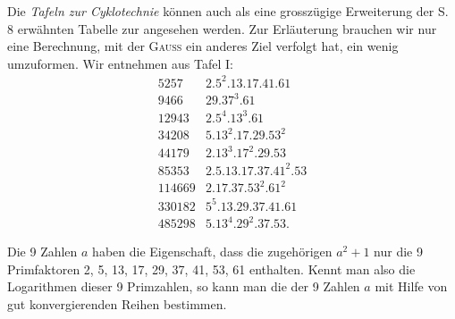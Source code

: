 Die \textit{Tafeln zur Cyklotechnie} können auch als eine grosszügige Erweiterung
der S. 8 erwähnten Tabelle zur  angesehen
werden. Zur Erläuterung brauchen wir nur eine Berechnung, mit der \textsc{Gauss}
ein anderes Ziel verfolgt hat, ein wenig umzuformen. Wir entnehmen aus
Tafel I:
\[
\begin{array}{r|l}
5257&2\mathord{.}5^2\mathord{.}13\mathord{.}17\mathord{.}41\mathord{.}61\\
9466&29\mathord{.}37^3\mathord{.}61\\
12943&2\mathord{.}5^4\mathord{.}13^3\mathord{.}61\\
34208&5\mathord{.}13^2\mathord{.}17\mathord{.}29\mathord{.}53^2\\
44179&2\mathord{.}13^3\mathord{.}17^2\mathord{.}29\mathord{.}53\\
85353&2\mathord{.}5\mathord{.}13\mathord{.}17\mathord{.}37\mathord{.}41^2\mathord{.}53\\
114669&2\mathord{.}17\mathord{.}37\mathord{.}53^2\mathord{.}61^2\\
330182&5^5\mathord{.}13\mathord{.}29\mathord{.}37\mathord{.}41\mathord{.}61\\
485298&5\mathord{.}13^4\mathord{.}29^2\mathord{.}37\mathord{.}53.
\end{array}
\]

Die 9 Zahlen $a$ haben die Eigenschaft, dass die zugehörigen $a^2+1$ nur
die 9 Primfaktoren 2, 5, 13, 17, 29, 37, 41, 53, 61 enthalten. Kennt man
\clearpage{}
\noindent also die Logarithmen dieser 9 Primzahlen, so kann man die der 9 Zahlen $a$
mit Hilfe von gut konvergierenden Reihen bestimmen.

